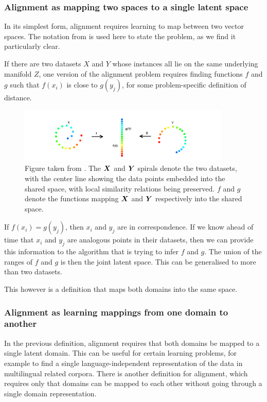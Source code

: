 \subsubsection{Alignment as mapping two spaces to a single latent space}
In its simplest form, alignment requires learning to map between two vector spaces. The notation from \cite{ManifoldLearningTheoryAndApplications} is used here to state the problem, as we find it particularly clear.

If there are two datasets $X$ and $Y$ whose instances all lie on the same underlying manifold $Z$, one version of the alignment problem requires finding functions $f$ and $g$ such that $f(x_i)$ is close  to $g(y_j)$, for some problem-specific definition of distance.

\begin{figure}[H]
    \centering
    \includegraphics[width=0.9\textwidth]{images/review/alignment.png}
    \caption{
        Figure taken from \cite{ManifoldLearningTheoryAndApplications}. The $\boldsymbol{X}$ and $\boldsymbol{Y}$ spirals denote the two datasets, with the center line showing the data points embedded into the shared space, with local similarity relations being preserved. $f$ and $g$ denote the functions mapping $\boldsymbol{X}$ and $\boldsymbol{Y}$ respectively into the shared space. 
    }
\end{figure}

If $f(x_i) = g(y_j)$, then $x_i$ and $y_j$ are in correspondence. If we know ahead of time that $x_i$ and $y_j$ are analogous points in their datasets, then we can provide this information to the algorithm that is trying to infer $f$ and $g$. The union of the ranges of $f$ and $g$ is then the joint latent space. This can be generalised to more than two datasets. 

This however is a definition that maps both domains into the same space. 

\subsubsection{Alignment as learning mappings from one domain to another}

In the previous definition, alignment requires that both domains be mapped to a single latent domain. This can be useful for certain learning problems, for example to find a single language-independent representation of the data in multilingual related corpora. There is another definition for alignment, which requires only that domains can be mapped to each other without going through a single domain representation. 

